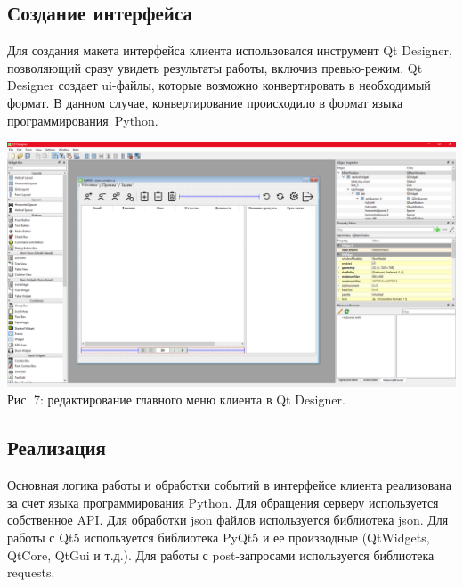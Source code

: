 \documentclass[14pt, a4paper]{extarticle}
\begin{document}
    \newpage
    \subsection{Создание интерфейса}
    Для создания макета интерфейса клиента использовался инструмент Qt Designer, позволяющий сразу увидеть результаты работы, включив превью-режим. Qt Designer создает ui-файлы, которые возможно конвертировать в необходимый формат. В данном случае, конвертирование происходило в формат языка программирования Python.
    \begin{center}
        \includegraphics[width=\textwidth]{img/qtdesigner.png}\\
        Рис. 7: редактирование главного меню клиента в Qt Designer.\\[\baselineskip]
    \end{center}


    \newpage
    \subsection{Реализация}
    Основная логика работы и обработки событий в интерфейсе клиента реализована за счет языка программирования Python. Для обращения серверу используется собственное API. Для обработки json файлов используется библиотека json. Для работы с Qt5 используется библиотека PyQt5 и ее производные (QtWidgets, QtCore, QtGui и т.д.). Для работы с post-запросами используется библиотека requests.
\end{document}
